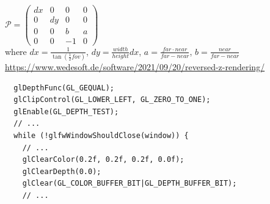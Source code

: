 \documentclass[calcdimensions,landscape,letterpaper]{powersem}
\newcommand{\thecurrentheading}{}
\newcommand{\heading}[1]{\renewcommand{\thecurrentheading}{#1}}
\begin{document}
\begin{slide}
\begin{center}
\begin{minipage}[c]{.45\textwidth}
        \end{minipage}\vspace{-16pt}\\
        $\mathcal{P}=
         \begin{pmatrix}
            dx & 0  &  0 & 0\\
            0  & dy &  0 & 0\\
            0  & 0  &  b & a\\
            0  & 0  & -1 & 0
        \end{pmatrix}$\medskip\\
        where
        $dx=\frac{1}{\tan(\frac{1}{2}fov)}$,
        $dy=\frac{width}{height}dx$,
        $a=\frac{far\cdot near}{far-near}$,
        $b=\frac{near}{far-near}$\bigskip\\
        \url{https://www.wedesoft.de/software/2021/09/20/reversed-z-rendering/}
    \end{center}
\end{slide}

\begin{slide}
    \heading{Enable Depth Testing}
    \begin{center}
        \begin{minipage}[c]{.8\textwidth}
            \begin{verbatim}
  glDepthFunc(GL_GEQUAL);
  glClipControl(GL_LOWER_LEFT, GL_ZERO_TO_ONE);
  glEnable(GL_DEPTH_TEST);
  // ...
  while (!glfwWindowShouldClose(window)) {
    // ...
    glClearColor(0.2f, 0.2f, 0.2f, 0.0f);
    glClearDepth(0.0);
    glClear(GL_COLOR_BUFFER_BIT|GL_DEPTH_BUFFER_BIT);
    // ...
            \end{verbatim}
        \end{minipage}
    \end{center}
\end{slide}

\end{document}
